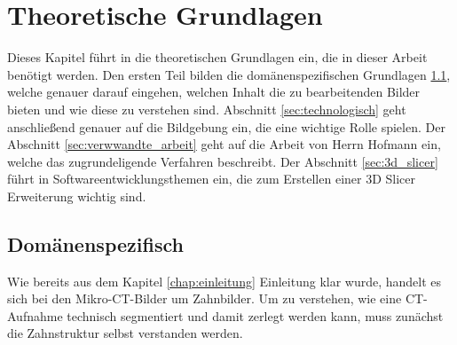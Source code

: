 \chapter{Theoretische Grundlagen}
\label{chap:theoretische_grundlagen} Dieses Kapitel führt in die theoretischen Grundlagen
ein, die in dieser Arbeit benötigt werden. Den ersten Teil bilden die domänenspezifischen
Grundlagen \ref{sec:domänenspezifisch}, welche genauer darauf eingehen, welchen Inhalt
die zu bearbeitenden Bilder bieten und wie diese zu verstehen sind. Abschnitt
\ref{sec:technologisch} geht anschließend genauer auf die Bildgebung ein, die eine
wichtige Rolle spielen. Der Abschnitt \ref{sec:verwwandte_arbeit} geht auf die
Arbeit von Herrn Hofmann ein, welche das zugrundeligende Verfahren beschreibt.
Der Abschnitt \ref{sec:3d_slicer} führt in Softwareentwicklungsthemen ein, die zum
Erstellen einer 3D Slicer Erweiterung wichtig sind.

\section{Domänenspezifisch}
\label{sec:domänenspezifisch} Wie bereits aus dem Kapitel \ref{chap:einleitung} Einleitung
klar wurde, handelt es sich bei den Mikro-\ac{CT}-Bilder um Zahnbilder. Um zu
verstehen, wie eine \ac{CT}-Aufnahme technisch segmentiert und damit zerlegt
werden kann, muss zunächst die Zahnstruktur selbst verstanden werden.

